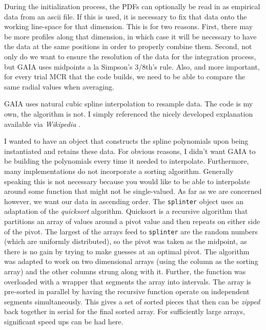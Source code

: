 \documentclass[10pt,a4paper,final]{article}
\numberwithin{equation}{section}
\begin{document}
\begin{multicols}{2}[]
				During the initialization process, the PDFs can optionally be
				read in as empirical data from an ascii file. If this is used,
				it is necessary to fix that data onto the working line-space 
				for that dimension. This is for two reasons. First, there may
				be more profiles along that dimension, in which case it will be
				necessary to have the data at the same positions in order to
				properly combine them. Second, not only do we want to ensure
				the resolution of the data for the integration process, but
				GAIA uses midpoints a la Simpson's 3/8th's rule. Also, and more 
				important, for every trial MCR that the code builds,
				we need to be able to compare the same radial values when averaging.
				
				GAIA uses natural cubic spline interpolation to resample data. The
				code is my own, the algorithm is not. I simply referenced the nicely
				developed explanation available via \textit{Wikipedia} 
				\cite{splinter, thomas}.

				I wanted to have an object that constructs the spline polynomials
				upon being instantiated and retains these data. For obvious reasons,
				I didn't want GAIA to be building the polynomials every time it 
				needed to interpolate. Furthermore, many implementations do not
				incorporate a sorting algorithm. Generally speaking this is not
				necessary because you would like to be able to interpolate around
				some function that might not be single-valued. As far as we are 
				concerned however, we want our data in ascending order. The
				\texttt{splinter} object uses an adaptation of the \textit{quicksort}
				algorithm. Quicksort is a recursive algorithm that partitions
				an array of values around a pivot value and then repeats on either
				side of the pivot. The largest of the arrays feed to \texttt{splinter}
				are the random numbers (which are uniformly distributed), so the pivot
				was taken as the midpoint, as there is no gain by trying to make
				guesses at an optimal pivot. The algorithm was adapted to work on
				two dimensional arrays (using the column as the sorting array) and
				the other columns strung along with it. Further, the function
				was overloaded with a wrapper that segments the array into intervals.
				The array is pre-sorted in parallel by having the recursive function
				operate on independent segments simultaneously. This gives a set of
				sorted pieces that then can be \textit{zipped} back together in serial
				for the final sorted array. For sufficiently large arrays, significant
				speed ups can be had here.


\end{multicols}
\end{document}
